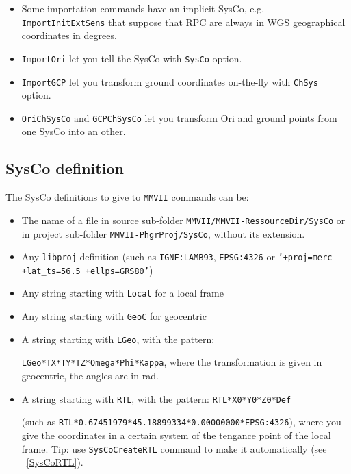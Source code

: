 \begin{itemize}
\item Some importation commands have an implicit SysCo, e.g. {\tt ImportInitExtSens} that suppose that RPC are always in WGS geographical coordinates in degrees.
\item {\tt ImportOri} let you tell the SysCo with {\tt SysCo} option.
\item {\tt ImportGCP} let you transform ground coordinates on-the-fly with {\tt ChSys} option.
\item {\tt OriChSysCo} and {\tt GCPChSysCo} let you transform Ori and ground points from one SysCo into an other.
\end{itemize}

\subsection{SysCo definition}
The SysCo definitions to give to {\tt MMVII} commands can be:
\begin{itemize}
\item The name of a file in source sub-folder {\tt MMVII/MMVII-RessourceDir/SysCo} or in project sub-folder {\tt MMVII-PhgrProj/SysCo}, without its extension.
\item Any {\tt libproj} definition (such as {\tt IGNF:LAMB93}, {\tt EPSG:4326} or {\tt '+proj=merc +lat\_ts=56.5 +ellps=GRS80'})
\item Any string starting with {\tt Local} for a local frame
\item Any string starting with {\tt GeoC} for geocentric
\item A string starting with {\tt LGeo}, with the pattern:

{\tt LGeo*TX*TY*TZ*Omega*Phi*Kappa}, where the transformation is given in geocentric, the angles are in rad. 
\item A string starting with {\tt RTL}, with the pattern: {\tt RTL*X0*Y0*Z0*Def}

(such as {\tt RTL*0.67451979*45.18899334*0.00000000*EPSG:4326}),
where you give the coordinates in a certain system of the tengance point of the local frame. Tip: use {\tt SysCoCreateRTL} command to make it automatically (see ~\ref{SysCoRTL}).

\end{itemize}


